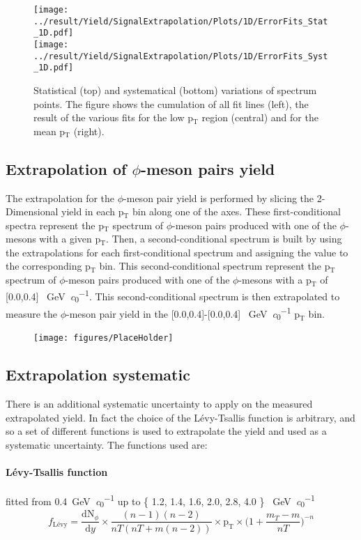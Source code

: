 \begin{figure}[!h]
\centering
\texttt{[image: ../result/Yield/SignalExtrapolation/Plots/1D/ErrorFits\_Stat\_1D.pdf]}\\
\texttt{[image: ../result/Yield/SignalExtrapolation/Plots/1D/ErrorFits\_Syst\_1D.pdf]}
\caption{Statistical (top) and systematical (bottom) variations of spectrum points. The figure shows the cumulation of all fit lines (left), the result of the various fits for the low p$_{\text{T}}$ region (central) and for the mean p$_{\text{T}}$ (right).}
\label{fig:Extrap1D}
\end{figure}

\subsection{Extrapolation of $\phi$-meson pairs yield}
The extrapolation for the $\phi$-meson pair yield is performed by slicing the 2-Dimensional yield in each p$_{\text{T}}$ bin along one of the axes. These first-conditional spectra represent the p$_{\text{T}}$ spectrum of $\phi$-meson pairs produced with one of the $\phi$-mesons with a given p$_{\text{T}}$. Then, a second-conditional spectrum is built by using the extrapolations for each first-conditional spectrum and assigning the value to the corresponding p$_{\text{T}}$ bin. This second-conditional spectrum represent the p$_{\text{T}}$ spectrum of $\phi$-meson pairs produced with one of the $\phi$-mesons with a p$_{\text{T}}$ of [0.0,0.4] \SI{}{\giga\electronvolt\per\clight}. This second-conditional spectrum is then extrapolated to measure the $\phi$-meson pair yield in the [0.0,0.4]-[0.0,0.4] \SI{}{\giga\electronvolt\per\clight} p$_{\text{T}}$ bin.\\
\begin{figure}
\centering
\texttt{[image: figures/PlaceHolder]}
\label{fig:Extrap2D}
\caption{}
\end{figure}

\subsection{Extrapolation systematic}
There is an additional systematic uncertainty to apply on the measured extrapolated yield. In fact the choice of the L\'evy-Tsallis function is arbitrary, and so a set of different functions is used to extrapolate the yield and used as a systematic uncertainty.
The functions used are:

\paragraph{L\'evy-Tsallis function} fitted from \SI{0.4}{\giga\electronvolt\per\clight} up to \{ 1.2, 1.4, 1.6, 2.0, 2.8, 4.0 \} \SI{}{\giga\electronvolt\per\clight}
\begin{equation}
f_{\text{L\'evy}} = \frac{\text{dN}_{\phi}}{\text{d}y}\times\frac{(n-1)(n-2)}{nT(nT+m(n-2))}\times\text{p}_{\text{T}}\times\Big( 1+ \frac{m_{T} -m}{nT} \Big)^{-n}
\label{eq:levy-tsallis}
\end{equation}

